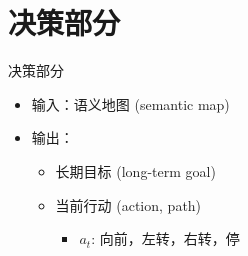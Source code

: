 \section{决策部分}
\label{sec:policy}
\begin{frame}{决策部分}
    \begin{itemize}
        \item 输入：语义地图 (semantic map)
        \item 输出：
              \begin{itemize}
                  \item 长期目标 (long-term goal)
                  \item 当前行动 (action, path)
                        \begin{itemize}
                            \item $a_t$: 向前，左转，右转，停
                        \end{itemize}
              \end{itemize}
    \end{itemize}
\end{frame}


